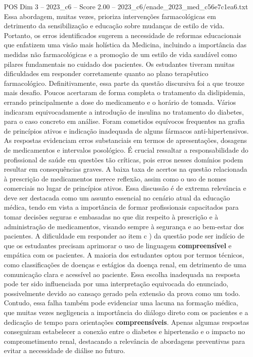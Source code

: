 \begin{textsample}{POS Dim 3 – 2023\_c6 – Score 2.00 – 2023\_c6/enade\_2023\_med\_c56e7c1ea6.txt}
Essa abordagem, muitas vezes, prioriza intervenções farmacológicas em detrimento da sensibilização e educação sobre mudanças de estilo de vida.
Portanto, os erros identificados sugerem a necessidade de reformas educacionais que enfatizem uma visão mais holística da Medicina, incluindo a importância das medidas não farmacológicas e a promoção de um estilo de vida saudável como pilares fundamentais no cuidado dos pacientes.
Os estudantes tiveram muitas dificuldades em responder corretamente quanto ao plano terapêutico farmacológico.
Definitivamente, essa parte da questão discursiva foi a que trouxe mais desafio.
Poucos acertaram de forma completa o tratamento da dislipidemia, errando principalmente a dose do medicamento e o horário de tomada.
Vários indicaram equivocadamente a introdução de insulina no tratamento do diabetes, para o caso concreto em análise.
Foram cometidos equívocos frequentes na grafia de princípios ativos e indicação inadequada de alguns fármacos anti-hipertensivos.
As respostas evidenciam erros substanciais em termos de apresentações, dosagens de medicamentos e intervalos posológico.
É crucial ressaltar a responsabilidade do profissional de saúde em questões tão críticas, pois erros nesses domínios podem resultar em consequências graves.
A baixa taxa de acertos na questão relacionada à prescrição de medicamentos merece reflexão, assim como o uso de nomes comerciais no lugar de princípios ativos.
Essa discussão é de extrema relevância e deve ser destacada como um assunto essencial no cenário atual da educação médica, tendo em vista a importância de formar profissionais capacitados para tomar decisões seguras e embasadas no que diz respeito à prescrição e à administração de medicamentos, visando sempre à segurança e ao bem-estar dos pacientes.
A dificuldade em responder ao item c ) da questão pode ser indício de que os estudantes precisam aprimorar o uso de linguagem \textbf{compreensível} e empática com os pacientes.
A maioria dos estudantes optou por termos técnicos, como classificações de doenças e estágios da doença renal, em detrimento de uma comunicação clara e acessível ao paciente.
Essa escolha inadequada na resposta pode ter sido influenciada por uma interpretação equivocada do enunciado, possivelmente devido ao cansaço gerado pela extensão da prova como um todo.
Contudo, essa falha também pode evidenciar uma lacuna na formação médica, que muitas vezes negligencia a importância do diálogo direto com os pacientes e a dedicação de tempo para orientações \textbf{compreensíveis}.
Apenas algumas respostas conseguiram estabelecer a conexão entre o diabetes e hipertensão e o impacto no comprometimento renal, destacando a relevância de abordagens preventivas para evitar a necessidade de diálise no futuro.

\end{textsample}
